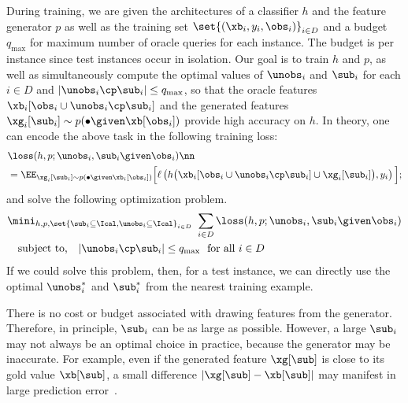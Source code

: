 \documentclass[letterpaper]{article}
\renewcommand{\cite}{\citep}
\begin{document}
During training, we are given the architectures of a classifier $h$ and the feature generator $p$ as well as the training set $\set{(\xb_i,y_i,\obs_i)}_{i\in D}$ and a budget $q_{\max}$ for maximum number of oracle queries for each instance. The budget is per instance since test instances occur in isolation. Our goal is to train $h$ and $p$, as well as simultaneously compute the optimal values of $\unobs_i$  and $\sub_i$ for each $i\in D $ and $|\unobs_i \cp \sub_i| \le q_{\max}$,
so that the oracle features $\xb_i[\obs_i \cup \unobs_i \cp \sub_i]$  and the generated features $\xg_i[\sub_i] \sim p(\bullet \given \xb[\obs_i ])$ provide high accuracy on $h$. In theory, one can encode the above task in the following training
loss:
\begin{align}
 &\loss(h,p; \unobs_i, \sub_i \given  \obs_i)\nn\\
 &= \EE_{\xg_i [\sub_i] \sim    p(\bullet \given \xb_i[\obs_i  ])} \Big[ \ell\left(h\big(\xb_i [\obs_i \cup \unobs_i \cp\sub_i] \cup \xg_i [\sub_i]\big), y_i\right)   \Big] \label{eq:loss};
\end{align}
and solve the following optimization problem.
\begin{align}
&     \mini_{h,p, \set{\sub_i \subseteq \Ical, \unobs_i \subseteq \Ical}_{i\in D}}\ \sum_{i\in D} \loss(h,p; \unobs_i, \sub_i \given  \obs_i)  \label{eq:obj}  \\
& \quad \text{subject to,} \quad   |\unobs_i \cp \sub_i| \le q_{\max} \ \ \text{for all } i\in D \label{eq:conn}
\end{align}
If we could solve this problem, then, for a test instance, we can directly use the optimal $\unobs^* _i$ and $\sub^* _i$ from the nearest training example.

%
There is no cost or budget associated with drawing features from the generator. Therefore, in principle, $\sub_i$ can be as large as possible. However, a large $\sub_i$ may not always be an optimal choice in practice, because the generator may be inaccurate. For example, even if the generated feature $\xg[\sub]$ is close to its gold value $\xb[\sub]$, a small  difference $|\xg[\sub]-\xb[\sub]|$ may manifest in large prediction error~\cite{szegedy2013intriguing,goodfellow2014explaining}.
\end{document}
